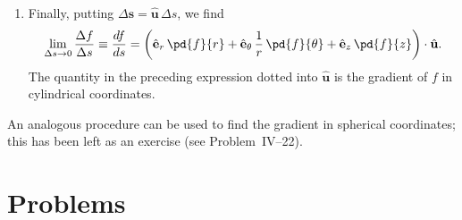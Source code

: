 \begin{enumerate}
  Note the factor $1/r$ in the second term to compensate for the
  factor $r$ in $\hat{\mathbf{e}}_\theta\,r\,\Delta\theta$ in
  $\Delta\mathbf{s}$.

  If we now write our expression for $\Delta f$ in terms of
  $\Delta\mathbf{s}$, we get
  \[
  \Delta f = \left(\hat{\mathbf{e}}_r\,\pd{f}{r}
    + \hat{\mathbf{e}}_\theta\,\frac{1}{r}\,\pd{f}{\theta}
    + \hat{\mathbf{e}}_z\,\pd{f}{z}\right)
    \cdot\Delta\mathbf{s} + \cdots\,.
  \]

\item Finally, putting $\Delta\mathbf{s} = \hat{\mathbf{u}}\,\Delta s$,
  we find
  \[
  \lim_{\Delta s\to 0}\frac{\Delta f}{\Delta s} \equiv \frac{df}{ds}
  = \left(\hat{\mathbf{e}}_r\,\pd{f}{r}
    + \hat{\mathbf{e}}_\theta\,\frac{1}{r}\,\pd{f}{\theta}
    + \hat{\mathbf{e}}_z\,\pd{f}{z}\right)
    \cdot\hat{\mathbf{u}}.
  \]
  The quantity in the preceding expression dotted into
  $\hat{\mathbf{u}}$ is the gradient of $f$ in cylindrical coordinates.
\end{enumerate}

An analogous procedure can be used to find the gradient in
spherical coordinates; this has been left as an exercise (see
Problem~IV--22).


\section{Problems}

